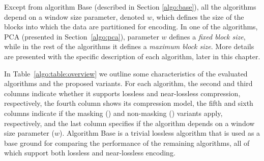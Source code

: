 Except from algorithm Base (described in Section \ref{algo:base}), all the algorithms depend on a window size parameter, denoted $w$, which defines the size of the blocks into which the data are partitioned for encoding. In one of the algorithms, PCA (presented in Section~\ref{algo:pca}), parameter $w$ defines a \textit{fixed block size}, while in the rest of the algorithms it defines a \textit{maximum block size}.
More details are presented with the specific description of each algorithm, later in this chapter.


In Table~\ref{algo:table:overview} we outline some characteristics of the evaluated algorithms and the proposed variants. For each algorithm, the second and third columns indicate whether it supports lossless and near-lossless compression, respectively, the fourth column shows its compression model, the fifth and sixth columns indicate if the masking (\maskalgo) and non-masking (\NOmaskalgo) variants apply, respectively, and the last column specifies if the algorithm depends on a window size parameter ($w$). Algorithm Base is a trivial lossless algorithm that is used as a base ground for comparing the performance of the remaining algorithms, all of which support both lossless and near-lossless encoding.


\clearpage




